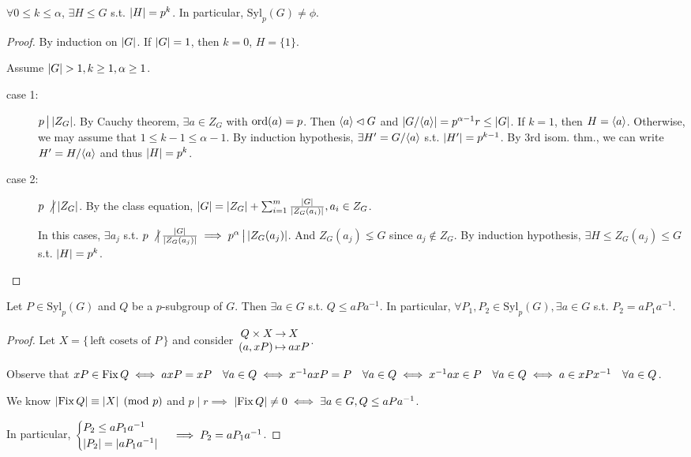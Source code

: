 \begin{theorem}
  $\forall 0 \le k \le \alpha$, $\exists H \le G$ s.t. $\abs{H} = p^k$.
  In particular, $\text{Syl}_p(G) \ne \phi$.

  \begin{proof}
    By induction on $\abs{G}$. If $\abs{G} = 1$, then $k = 0$, $H = \{1\}$.

    Assume $\abs{G} > 1, k \ge 1, \alpha \ge 1$.

    \begin{description}
      \item[case 1:] $p \Div \abs{Z_G}$. By Cauchy theorem,
        $\exists a \in Z_G$ with $\ord(a) = p$.
        Then $\gen{a} \lhd G$ and $\abs*{\quot{G}{\gen{a}}} = p^{\alpha-1} r
        \le \abs{G}$.
        If $k=1$, then $H = \gen{a}$.
        Otherwise, we may assume that $1\le k-1\le \alpha-1$. By induction
        hypothesis, $\exists H' = \quot{G}{\gen{a}}$ s.t. $\abs{H'} = p^{k-1}$.
        By 3rd isom. thm., we can write $H' = \quot{H}{\gen{a}}$ and thus
        $\abs{H} = p^k$.
      \item[case 2:] $p \nDiv \abs{Z_G}$. By the class equation,
        $\abs{G} = \abs{Z_G} + \sum_{i=1}^m \frac{\abs{G}}{\abs{Z_G(a_i)}},
        a_i \in Z_G$.

        In this cases, $\exists a_j$ s.t.
        $p \nDiv \frac{\abs{G}}{\abs{Z_G(a_j)}} \implies
        p^\alpha \Div \abs{Z_G(a_j)}$. And $Z_G(a_j) \lneq G$ since
        $a_j \not\in Z_G$.
        By induction hypothesis, $\exists H \le Z_G(a_j) \le G$ s.t.
        $\abs{H} = p^k$. \qedhere
    \end{description}
  \end{proof}
\end{theorem}

\begin{theorem}
  Let $P \in \text{Syl}_p(G)$ and $Q$ be a $p$-subgroup of $G$. Then
  $\exists a \in G$ s.t. $Q \le aPa^{-1}$.
  In particular, $\forall P_1, P_2 \in \text{Syl}_p(G), \exists a \in G$
  s.t. $P_2 = aP_1a^{-1}$.
  \begin{proof}
    Let $X = \{\, \text{left cosets of $P$} \,\}$ and consider
    $\arraycolsep=1pt \begin{array}{rcl}
      Q \times X & \to & X \\
      (a, xP) & \mapsto & axP
    \end{array}$.

    Observe that $xP \in \Fix Q \iff axP = xP \quad \forall a \in Q \iff
    x^{-1}axP = P \quad \forall a \in Q \iff
    x^{-1}ax \in P \quad \forall a \in Q \iff
    a \in xPx^{-1} \quad \forall a \in Q$.

    We know $\abs{\Fix Q} \equiv \abs{X} \pmod p$ and $p \mid r \implies$
    $\abs{\Fix Q} \ne 0 \iff \exists a \in G, Q \le aPa^{-1}$.

    In particular, $\begin{cases}
      P_2 \le aP_1a^{-1} \\
      \abs{P_2} = \abs{aP_1a^{-1}}
    \end{cases} \implies P_2 = aP_1a^{-1}$.
  \end{proof}
\end{theorem}

